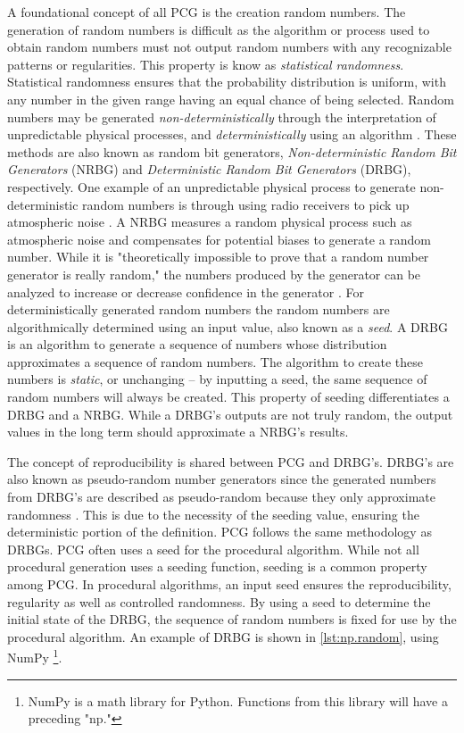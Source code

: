 \documentclass[10pt]{report}
\begin{document}
			A foundational concept of all PCG is the creation random numbers. The generation of random numbers is difficult as the algorithm or process used to obtain random numbers must not output random numbers with any recognizable patterns or regularities. This property is know as \emph{statistical randomness}. Statistical randomness ensures that the probability distribution is uniform, with any number in the given range having an equal chance of being selected. Random numbers may be generated \emph{non-deterministically} through the interpretation of unpredictable physical processes, and \emph{deterministically} using an algorithm \cite{rng}. These methods are also known as random bit generators, \emph{Non-deterministic Random Bit Generators} (NRBG) and \emph{Deterministic Random Bit Generators} (DRBG), respectively. One example of an unpredictable physical process to generate non-deterministic random numbers is through using radio receivers to pick up atmospheric noise \cite{random-org}. A NRBG measures a random physical process such as atmospheric noise and compensates for potential biases to generate a random number. While it is "theoretically impossible to prove that a random number generator is really random," the numbers produced by the generator can be analyzed to increase or decrease confidence in the generator \cite{random-org}. For deterministically generated random numbers the random numbers are algorithmically determined using an input value, also known as a \emph{seed}. A DRBG is an algorithm to generate a sequence of numbers whose distribution approximates a sequence of random numbers. The algorithm to create these numbers is \emph{static}, or unchanging -- by inputting a seed, the same sequence of random numbers will always be created. This property of seeding differentiates a DRBG and a NRBG. While a DRBG's outputs are not truly random, the output values in the long term should approximate a NRBG's results.  
			
			The concept of reproducibility is shared between PCG and DRBG's. DRBG's are also known as pseudo-random number generators since the generated numbers from DRBG's are described as pseudo-random because they only approximate randomness \cite{rng}. This is due to the necessity of the seeding value, ensuring the deterministic portion of the definition. PCG follows the same methodology as DRBGs. PCG often uses a seed for the procedural algorithm. While not all procedural generation uses a seeding function, seeding is a common property among PCG. In procedural algorithms, an input seed ensures the reproducibility, regularity as well as controlled randomness. By using a seed to determine the initial state of the DRBG, the sequence of random numbers is fixed for use by the procedural algorithm. An example of DRBG is shown in \autoref{lst:np.random}, using NumPy \footnote{NumPy is a math library for Python. Functions from this library will have a preceding "np."}.
			
\end{document}
